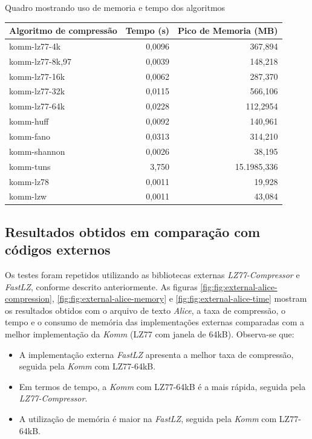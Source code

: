 \begin{quadro}[ht]
\caption{Quadro mostrando uso de memoria e tempo dos algoritmos}\label{quadro:resultados-komm-smiley}
\begin{tabular}{|l|r|r|}
    \hline
    \textbf{Algoritmo de compressão}& \textbf{Tempo (s)}  & \textbf{Pico de Memoria (MB)} \\ \hline
    komm-lz77-4k & 0,0096 & 367,894 \\ \hline
    komm-lz77-8k,97 & 0,0039 & 148,218 \\ \hline
    komm-lz77-16k & 0,0062 & 287,370 \\ \hline
    komm-lz77-32k & 0,0115 & 566,106 \\ \hline
    komm-lz77-64k & 0,0228 & 112,2954 \\ \hline
    komm-huff & 0,0092 & 140,961 \\ \hline
    komm-fano & 0,0313 & 314,210 \\ \hline
    komm-shannon & 0,0026 & 38,195 \\ \hline
    komm-tuns & 3,750 & 15.1985,336 \\ \hline
    komm-lz78 & 0,0011 & 19,928 \\ \hline
    komm-lzw & 0,0011 & 43,084 \\ \hline

\end{tabular}
\fonteproprioautor
\end{quadro}

\newpage

\subsection{Resultados obtidos em comparação com códigos externos}

Os testes foram repetidos utilizando as bibliotecas externas \textit{LZ77-Compressor} e \textit{FastLZ}, conforme descrito anteriormente. As figuras \ref{fig:fig:external-alice-compression}, \ref{fig:fig:external-alice-memory} e \ref{fig:fig:external-alice-time} mostram os resultados obtidos com o arquivo de texto \textit{Alice}, a taxa de compressão, o tempo e o consumo de memória das implementações externas comparadas com a melhor implementação da \textit{Komm} (LZ77 com janela de 64kB). Observa-se que:
\begin{itemize}
  \item A implementação externa \textit{FastLZ} apresenta a melhor taxa de compressão, seguida pela \textit{Komm} com LZ77-64kB.
  \item Em termos de tempo, a \textit{Komm} com LZ77-64kB é a mais rápida, seguida pela \textit{LZ77-Compressor}.
  \item A utilização de memória é maior na \textit{FastLZ}, seguida pela \textit{Komm} com LZ77-64kB.
\end{itemize}

